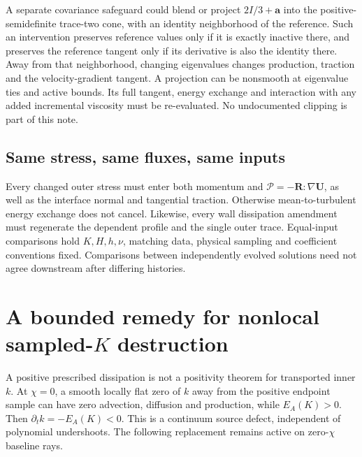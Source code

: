 \documentclass[11pt,a4paper]{article}
\numberwithin{equation}{section}
\begin{document}
A separate covariance safeguard could blend or project
$2I/3+\bm a$ into the positive-semidefinite trace-two cone, with an
identity neighborhood of the reference. Such an intervention preserves
reference values only if it is exactly inactive there, and preserves
the reference tangent only if its derivative is also the identity
there. Away from that neighborhood, changing eigenvalues changes
production, traction and the velocity-gradient tangent. A projection
can be nonsmooth at eigenvalue ties and active bounds. Its full tangent,
energy exchange and interaction with any added incremental viscosity
must be re-evaluated. No undocumented clipping is part of this note.

\subsection{Same stress, same fluxes, same inputs}
Every changed outer stress must enter both momentum and
$\mathcal P=-\bm R:\nabla\bm U$, as well as the interface normal
and tangential traction. Otherwise mean-to-turbulent energy exchange
does not cancel. Likewise, every wall dissipation amendment must
regenerate the dependent profile and the single outer trace. Equal-input
comparisons hold $K,H,h,\nu$, matching data, physical sampling and
coefficient conventions fixed. Comparisons between independently
evolved solutions need not agree downstream after differing histories.


\section{A bounded remedy for nonlocal sampled-\texorpdfstring{$K$}{K} destruction}
\label{sec:wj-wall-positivity}

A positive prescribed dissipation is not a positivity theorem for
transported inner $k$. At $\chi=0$, a smooth locally flat zero of $k$
away from the positive endpoint sample can have zero advection, diffusion
and production, while $E_A(K)>0$. Then $\partial_tk=-E_A(K)<0$.
This is a continuum source defect, independent of polynomial undershoots.
The following replacement remains active on zero-$\chi$ baseline rays.
\end{document}

